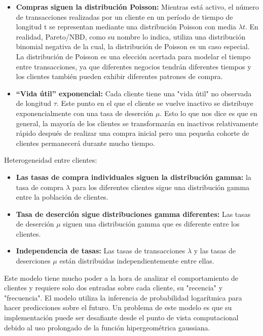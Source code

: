 \begin{itemize}
	\item \textbf{Compras siguen la distribución Poisson:} Mientras está activo, el número de transacciones realizadas por un cliente en un período de tiempo de longitud t se representan mediante una distribución Poisson con media $\lambda t$. En realidad, Pareto/NBD, como su nombre lo indica, utiliza una distribución binomial negativa de la cual, la distribución de Poisson es un caso especial. La distribución de Poisson es una elección acertada para modelar el tiempo entre transacciones, ya que diferentes negocios tendrán diferentes tiempos y los clientes también pueden exhibir diferentes patrones de compra.
	\item \textbf{“Vida útil” exponencial:} Cada cliente tiene una "vida útil" no observada de longitud $\tau$. Este punto en el que el cliente se vuelve inactivo se distribuye exponencialmente con una tasa de deserción $\mu$. Esto lo que nos dice es que en general, la mayoría de los clientes se transformarán en inactivos relativamente rápido después de realizar una compra inicial pero una pequeña cohorte de clientes permanecerá durante mucho tiempo.
\end{itemize}

Heterogeneidad entre clientes:

\begin{itemize}
	\item \textbf{Las tasas de compra individuales siguen la distribución gamma:} la tasa de compra $\lambda$ para los diferentes clientes sigue una distribución gamma entre la población de clientes.
	\item \textbf{Tasa de deserción sigue distribuciones gamma diferentes:} Las tasas de deserción $\mu$ siguen una distribución gamma que es diferente entre los clientes.
	\item \textbf{Independencia de tasas:} Las tasas de transacciones $\lambda$ y las tasas de deserciones $\mu$ están distribuidas independientemente entre ellas.
\end{itemize}

Este modelo tiene mucho poder a la hora de analizar el comportamiento de clientes y requiere solo dos entradas sobre cada cliente, su "recencia" y "frecuencia". El modelo utiliza la inferencia de probabilidad logarítmica para hacer predicciones sobre el futuro. Un problema de este modelo es que su implementación puede ser desafiante desde el punto de vista computacional debido al uso prolongado de la función hipergeométrica gaussiana.

